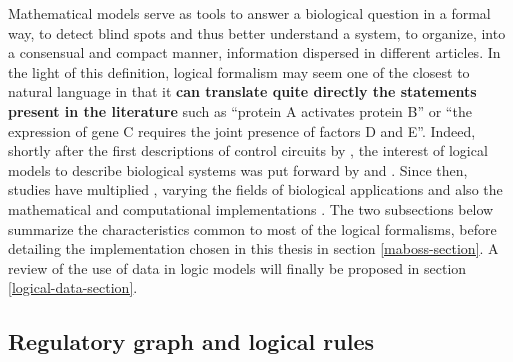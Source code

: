 \documentclass[a4paper,12pt,twoside,onecolumn,openright,final,oldfontcommands]{memoir}
\begin{document}
Mathematical models serve as tools to answer a biological question in a
formal way, to detect blind spots and thus better understand a system,
to organize, into a consensual and compact manner, information dispersed
in different articles. In the light of this definition, logical
formalism may seem one of the closest to natural language in that it
\textbf{can translate quite directly the statements present in the
literature} such as ``protein A activates protein B'' or ``the
expression of gene C requires the joint presence of factors D and E''.
Indeed, shortly after the first descriptions of control circuits by
\citet{jacob1961genetic}, the interest of logical models to describe
biological systems was put forward by \citet{kauffman1969homeostasis}
and \citet{thomas1973boolean}. Since then, studies have multiplied
\citep{thomas1990biological}, varying the fields of biological
applications and also the mathematical and computational implementations
\citep{naldi2018colomoto}. The two subsections below summarize the
characteristics common to most of the logical formalisms, before
detailing the implementation chosen in this thesis in section
\ref{maboss-section}. A review of the use of data in logic models will
finally be proposed in section \ref{logical-data-section}.

\subsection{Regulatory graph and logical
rules}\label{regulatory-graph-and-logical-rules}
\end{document}
